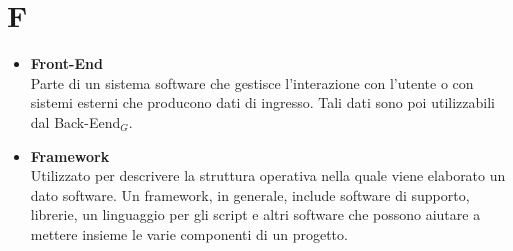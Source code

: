 \chapter{F} \label{F}
\begin{itemize}
	\item \textbf{Front-End} \\
	Parte di un sistema software che gestisce l'interazione con l'utente o con sistemi esterni che producono dati di ingresso.
	Tali dati sono poi utilizzabili dal Back-Eend$_G$.
	
	
	\item \textbf{Framework} \\
	Utilizzato per descrivere la struttura operativa nella quale viene elaborato un dato software.
	Un framework, in generale, include software di supporto, librerie, un linguaggio per gli script e altri software che possono aiutare a mettere insieme le varie componenti di un progetto.
	
\end{itemize}